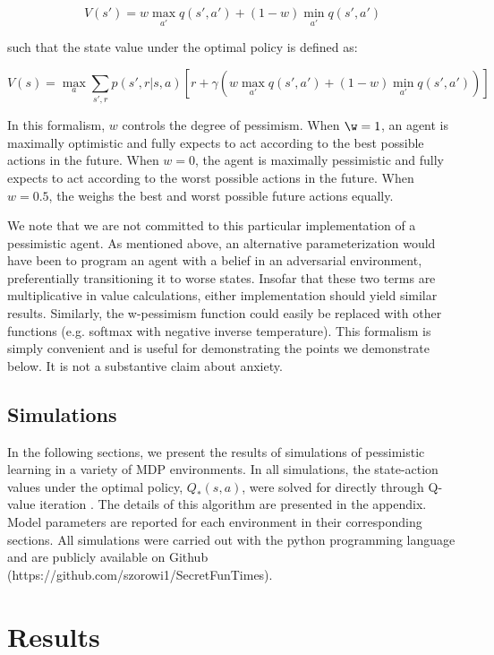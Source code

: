 \documentclass[11pt]{article} %
\begin{document}
$$ V(s') = w \max_{a'} q(s',a') + (1 - w) \min_{a'} q(s',a') $$

such that the state value under the optimal policy is defined as:

$$ V(s) = \max_a \sum_{s',r}p(s',r|s,a) \left[ r + \gamma \left( w \max_{a'} q(s',a') + (1 - w) \min_{a'} q(s',a') \right) \right] $$

In this formalism, $w$ controls the degree of pessimism. When $\w = 1$, an agent is maximally optimistic and fully expects to act according to the best possible actions in the future. When $w = 0$, the agent is maximally pessimistic and fully expects to act according to the worst possible actions in the future. When $w = 0.5$, the weighs the best and worst possible future actions equally.

We note that we are not committed to this particular implementation of a pessimistic agent. As mentioned above, an alternative parameterization would have been to program an agent with a belief in an adversarial environment, preferentially transitioning it to worse states. Insofar that these two terms are multiplicative in value calculations, either implementation should yield similar results. Similarly, the w-pessimism function could easily be replaced with other functions (e.g. softmax with negative inverse temperature). This formalism is simply convenient and is useful for demonstrating the points we demonstrate below. It is not a substantive claim about anxiety.

\subsection{Simulations}

In the following sections, we present the results of simulations of pessimistic learning in a variety of MDP environments. In all simulations, the state-action values under the optimal policy, $Q_*(s,a)$, were solved for directly through Q-value iteration \citep{SuttonBarto1998, SuttonBarto1998, bertsekas2005}. The details of this algorithm are presented in the appendix. Model parameters are reported for each environment in their corresponding sections. All simulations were carried out with the python programming language and are publicly available on Github (https://github.com/szorowi1/SecretFunTimes).

\section{Results}
\end{document}
